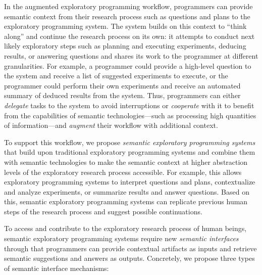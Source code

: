 In the augmented exploratory programming workflow, programmers can provide semantic context from their research process such as questions and plans to the exploratory programming system.
The system builds on this context to ``think along'' and continue the research process on its own:
it attempts to conduct next likely exploratory steps such as planning and executing experiments, deducing results, or answering questions and shares its work to the programmer at different granularities.
For example, a programmer could provide a high-level question to the system and receive a list of suggested experiments to execute, or the programmer could perform their own experiments and receive an automated summary of deduced results from the system.
Thus, programmers can either \emph{delegate} tasks to the system to avoid interruptions or \emph{cooperate} with it to benefit from the capabilities of semantic technologies---such as processing high quantities of information---and \emph{augment} their workflow with additional context.

To support this workflow, we propose \emph{semantic exploratory programming systems} that build upon traditional exploratory programming systems and combine them with semantic technologies to make the semantic context at higher abstraction levels of the exploratory research process accessible.
For example, this allows exploratory programming systems to interpret questions and plans, contextualize and analyze experiments, or summarize results and answer questions.
Based on this, semantic exploratory programming systems can replicate previous human steps of the research process and suggest possible continuations.

To access and contribute to the exploratory research process of human beings, semantic exploratory programming systems require new \emph{semantic interfaces} through that programmers can provide contextual artifacts as inputs and retrieve semantic suggestions and answers as outputs.
Concretely, we propose three types of semantic interface mechanisms:

